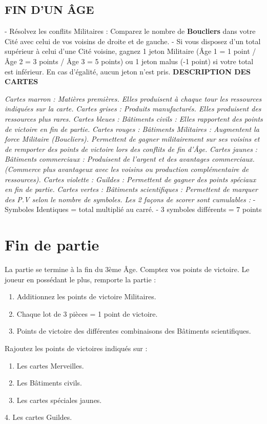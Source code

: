 \documentclass{article}%
\begin{document}
%
\subsection{ FIN D’UN ÂGE
}%
\label{subsec:FINDUNGE}%
{-} Résolvez les conflits Militaires : Comparez le nombre de %
\textbf{Boucliers}%
\textit{ }%
 dans votre Cité avec celui de vos voisins de droite et de gauche.
%
{-} Si vous disposez d’un total supérieur à celui d’une Cité voisine, gagnez 1 jeton Militaire (Âge 1 = 1 point / Âge 2 = 3 points /
%
Âge 3 = 5 points) ou 1 jeton malus ({-}1 point) si votre total est inférieur. En cas d'égalité, aucun jeton n’est pris.
%
\textbf{DESCRIPTION DES CARTES}%

%
\textit{ }%
\textit{Cartes marron}%
\textit{ : Matières premières. Elles produisent à chaque tour les ressources indiquées sur la carte.
}%
\textit{ }%
\textit{Cartes grises}%
\textit{ : Produits manufacturés. Elles produisent des ressources plus rares.
}%
\textit{ }%
\textit{Cartes bleues}%
\textit{ : Bâtiments civils : Elles rapportent des points de victoire en fin de partie.
}%
\textit{ }%
\textit{Cartes rouges}%
\textit{ : Bâtiments Militaires : Augmentent la force Militaire (Boucliers). Permettent de gagner militairement sur ses voisins et de remporter des points de victoire lors des conflits de fin d’Âge.
}%
\textit{ }%
\textit{Cartes jaunes}%
\textit{ : Bâtiments commerciaux : Produisent de l’argent et des avantages commerciaux. (Commerce plus avantageux avec les voisins ou production complémentaire de ressources).
}%
\textit{ }%
\textit{Cartes violette}%
\textit{ : Guildes : Permettent de gagner des points spéciaux en fin de partie.
}%
\textit{ }%
\textit{Cartes vertes}%
\textit{ : Bâtiments scientifiques : Permettent de marquer des P.V selon le nombre de symboles. Les 2 façons de scorer sont cumulables :
}%
{-} Symboles Identiques = total multiplié au carré.
%
{-} 3 symboles différents = 7 points


%
\section{ Fin de partie
}%
\label{sec:Findepartie}%
La partie se termine à la fin du 3ème Âge. Comptez vos points de victoire. Le joueur en possédant le plus, remporte la partie :
%
\begin{enumerate}%
\item%
%
 Additionnez les points de victoire Militaires.
%
\item%
%
 Chaque lot de 3 pièces = 1 point de victoire.
%
\item%
%
 Points de victoire des différentes combinaisons des Bâtiments scientifiques.
%
\end{enumerate}%
Rajoutez les points de victoires indiqués sur :
%
\begin{enumerate}%
\item%
%
 Les cartes Merveilles.
%
\item%
%
 Les Bâtiments civils. 
%
\item%
%
 Les cartes spéciales jaunes.
%
\end{enumerate}%
4. Les cartes Guildes.

%
\end{document}
